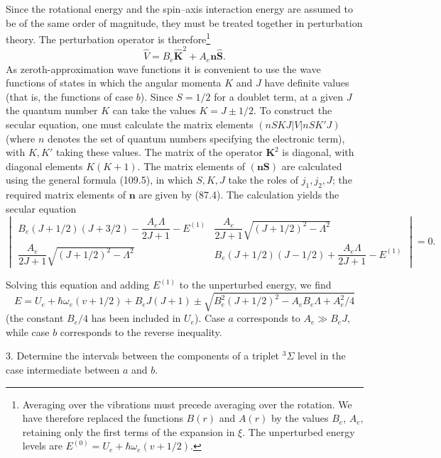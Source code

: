 \SolutionHeading Since the rotational energy and the spin--axis interaction energy are assumed to be of the same order of magnitude, they must be treated together in perturbation theory. The perturbation operator is therefore\footnote{Averaging over the vibrations must precede averaging over the rotation. We have therefore replaced the functions $B(r)$ and $A(r)$ by the values $B_e$, $A_e$, retaining only the first terms of the expansion in $\xi$. The unperturbed energy levels are $E^{(0)}=U_e+\hbar\omega_e(v+1/2)$.}
\[
 \widehat V=B_e\widehat{\mathbf K}^{2}+A_e\mathbf n\widehat{\mathbf S}.
\]
As zeroth-approximation wave functions it is convenient to use the wave functions of states in which the angular momenta $K$ and $J$ have definite values (that is, the functions of case $b$). Since $S=1/2$ for a doublet term, at a given $J$ the quantum number $K$ can take the values $K=J\pm1/2$. To construct the secular equation, one must calculate the matrix elements $(nSKJ|V|nSK'J)$ (where $n$ denotes the set of quantum numbers specifying the electronic term), with $K,K'$ taking these values. The matrix of the operator $\mathbf K^2$ is diagonal, with diagonal elements $K(K+1)$. The matrix elements of $(\mathbf n\mathbf S)$ are calculated using the general formula (109.5), in which $S,K,J$ take the roles of $j_1,j_2,J$; the required matrix elements of $\mathbf n$ are given by (87.4). The calculation yields the secular equation
\begingroup\small
\[
\begin{vmatrix}
B_e(J+1/2)(J+3/2)-\dfrac{A_e\Lambda}{2J+1}-E^{(1)} & \dfrac{A_e}{2J+1}\sqrt{(J+1/2)^2-\Lambda^2}\\[6pt]
\dfrac{A_e}{2J+1}\sqrt{(J+1/2)^2-\Lambda^2} & B_e(J+1/2)(J-1/2)+\dfrac{A_e\Lambda}{2J+1}-E^{(1)}
\end{vmatrix}=0.
\]
\endgroup

Solving this equation and adding $E^{(1)}$ to the unperturbed energy, we find
\[
 E=U_e+\hbar\omega_e(v+1/2)+B_eJ(J+1)
 \pm\sqrt{B_e^2(J+1/2)^2-A_eB_e\Lambda+A_e^2/4}
\]
(the constant $B_e/4$ has been included in $U_e$). Case $a$ corresponds to $A_e\gg B_eJ$, while case $b$ corresponds to the reverse inequality.

3. Determine the intervals between the components of a triplet ${}^3\Sigma$ level in the case intermediate between $a$ and $b$.

